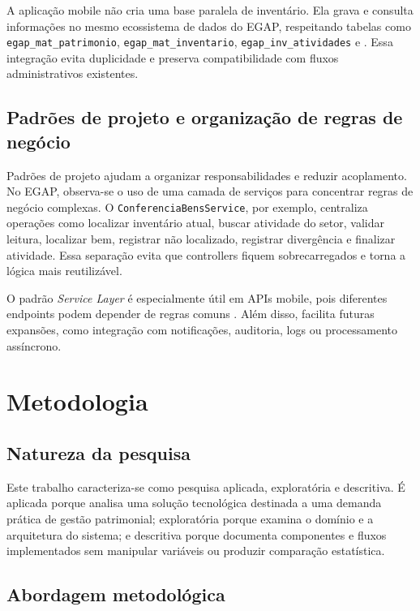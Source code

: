 \documentclass[12pt,a4paper]{article}
\begin{document}
A aplicação mobile não cria uma base paralela de inventário. Ela grava e consulta informações no mesmo ecossistema de dados do EGAP, respeitando tabelas como \texttt{egap\_mat\_patrimonio}, \texttt{egap\_mat\_inventario}, \texttt{egap\_inv\_atividades} e . Essa integração evita duplicidade e preserva compatibilidade com fluxos administrativos existentes.

\subsection{Padrões de projeto e organização de regras de negócio}

Padrões de projeto ajudam a organizar responsabilidades e reduzir acoplamento. No EGAP, observa-se o uso de uma camada de serviços para concentrar regras de negócio complexas. O \texttt{ConferenciaBensService}, por exemplo, centraliza operações como localizar inventário atual, buscar atividade do setor, validar leitura, localizar bem, registrar não localizado, registrar divergência e finalizar atividade. Essa separação evita que controllers fiquem sobrecarregados e torna a lógica mais reutilizável.

O padrão \textit{Service Layer} é especialmente útil em APIs mobile, pois diferentes endpoints podem depender de regras comuns \cite{fowler-service}. Além disso, facilita futuras expansões, como integração com notificações, auditoria, logs ou processamento assíncrono.

\section{Metodologia}

\subsection{Natureza da pesquisa}

Este trabalho caracteriza-se como pesquisa aplicada, exploratória e descritiva. É aplicada porque analisa uma solução tecnológica destinada a uma demanda prática de gestão patrimonial; exploratória porque examina o domínio e a arquitetura do sistema; e descritiva porque documenta componentes e fluxos implementados sem manipular variáveis ou produzir comparação estatística.

\subsection{Abordagem metodológica}
\end{document}
